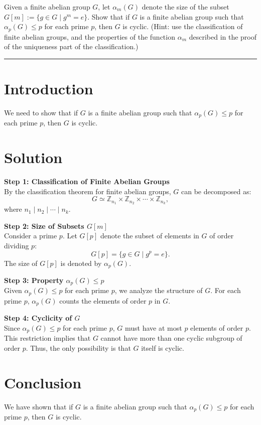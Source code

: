 \documentclass[12pt]{amsart}
\theoremstyle{definition}
\numberwithin{equation}{section}
\newcommand{\Z}{\mathbb{Z}}
\begin{document}
\begin{exercise}{6} Given a finite abelian group \(G\), let \( \alpha_m (G)\) denote the size of the subset \(G[m] := \{g \in G \mid g^m = e\} \). Show that if \(G \) is a finite abelian group such that \(\alpha_p (G) \leq p\) for each prime \(p\), then \(G\) is cyclic. (Hint: use the classification of finite abelian groups, and the properties of the function \(\alpha_m \) described in the proof of the uniqueness part of the classification.)

    \noindent\rule{\linewidth}{1pt}

    \section*{Introduction}
    We need to show that if \(G\) is a finite abelian group such that \(\alpha_p(G) \leq p\) for each prime \(p\), then \(G\) is cyclic.

    \section*{Solution}
    \noindent \textbf{Step 1: Classification of Finite Abelian Groups}\\
    By the classification theorem for finite abelian groups, \(G\) can be decomposed as:
    \[
    G \simeq \Z_{n_1} \times \Z_{n_2} \times \cdots \times \Z_{n_k},
    \]
    where \(n_1 \mid n_2 \mid \cdots \mid n_k\).

    \noindent \textbf{Step 2: Size of Subsets \(G[m]\)}\\
    Consider a prime \(p\). Let \(G[p]\) denote the subset of elements in \(G\) of order dividing \(p\):
    \[
    G[p] = \{g \in G \mid g^p = e\}.
    \]
    The size of \(G[p]\) is denoted by \(\alpha_p(G)\).

    \noindent \textbf{Step 3: Property \(\alpha_p(G) \leq p\)}\\
    Given \(\alpha_p(G) \leq p\) for each prime \(p\), we analyze the structure of \(G\). For each prime \(p\), \(\alpha_p(G)\) counts the elements of order \(p\) in \(G\).

    \noindent \textbf{Step 4: Cyclicity of \(G\)}\\
    Since \(\alpha_p(G) \leq p\) for each prime \(p\), \(G\) must have at most \(p\) elements of order \(p\). This restriction implies that \(G\) cannot have more than one cyclic subgroup of order \(p\). Thus, the only possibility is that \(G\) itself is cyclic.

    \section*{Conclusion}
    We have shown that if \(G\) is a finite abelian group such that \(\alpha_p(G) \leq p\) for each prime \(p\), then \(G\) is cyclic.

\end{exercise}
\end{document}
